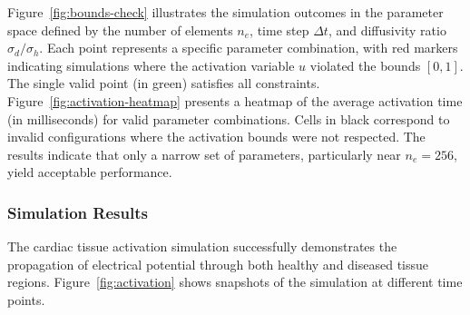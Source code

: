 \documentclass[12pt,a4paper]{article}
\begin{document}
Figure~\ref{fig:bounds-check} illustrates the simulation outcomes in the parameter space defined by the number of elements $n_e$, time step $\Delta t$, and diffusivity ratio $\sigma_d/\sigma_h$. Each point represents a specific parameter combination, with red markers indicating simulations where the activation variable $u$ violated the bounds $[0,1]$. The single valid point (in green) satisfies all constraints. \\
Figure~\ref{fig:activation-heatmap} presents a heatmap of the average activation time (in milliseconds) for valid parameter combinations. Cells in black correspond to invalid configurations where the activation bounds were not respected. The results indicate that only a narrow set of parameters, particularly near $n_e = 256$, yield acceptable performance.

\subsubsection*{Simulation Results}

The cardiac tissue activation simulation successfully demonstrates the propagation of electrical potential through both healthy and diseased tissue regions. Figure~\ref{fig:activation} shows snapshots of the simulation at different time points.
\end{document}
